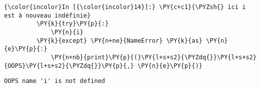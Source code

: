     \begin{Verbatim}[commandchars=\\\{\},frame=single,framerule=0.3mm,rulecolor=\color{cellframecolor}]
{\color{incolor}In [{\color{incolor}14}]:} \PY{c+c1}{\PYZsh{} ici i est à nouveau indéfinie}
         \PY{k}{try}\PY{p}{:}
             \PY{n}{i}
         \PY{k}{except} \PY{n+ne}{NameError} \PY{k}{as} \PY{n}{e}\PY{p}{:}
             \PY{n+nb}{print}\PY{p}{(}\PY{l+s+s2}{\PYZdq{}}\PY{l+s+s2}{OOPS}\PY{l+s+s2}{\PYZdq{}}\PY{p}{,} \PY{n}{e}\PY{p}{)}
\end{Verbatim}


    \begin{Verbatim}[commandchars=\\\{\},frame=single,framerule=0.3mm,rulecolor=\color{cellframecolor}]
OOPS name 'i' is not defined
\end{Verbatim}


    
    
    
